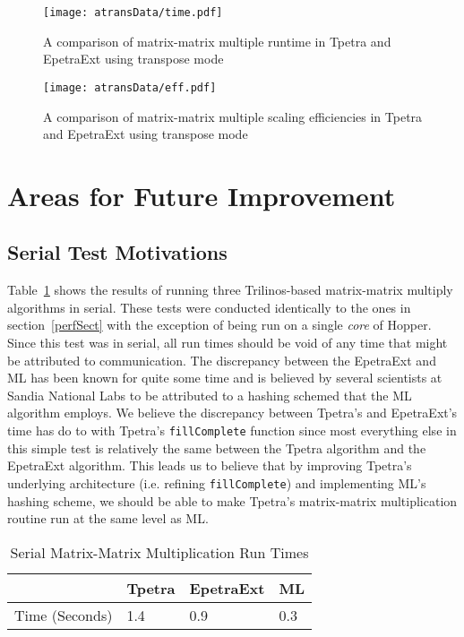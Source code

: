 \documentclass[pdf,12pt]{SANDreport}
\begin{document}
\begin{figure}
\centering
\texttt{[image: atransData/time.pdf]}
\caption[Transpose Time Comparison]{A comparison of matrix-matrix multiple runtime in Tpetra and EpetraExt using transpose mode}
\label{transtime}
\end{figure}

\begin{figure}
\centering
\texttt{[image: atransData/eff.pdf]}
\caption[Transpose Efficiency Comparison]{A comparison of matrix-matrix multiple scaling efficiencies in Tpetra and EpetraExt using transpose mode}
\label{transeff}
\end{figure}

\section{Areas for Future Improvement}

\subsection{Serial Test Motivations}
Table~\ref{serialTable} shows the results of running three Trilinos-based matrix-matrix multiply algorithms in 
serial. These tests were conducted identically to the ones in section~\ref{perfSect} with the exception of being run on a 
single \emph{core} of Hopper. Since this test was in serial, all run times should be void of any time that might be 
attributed to communication. The discrepancy between the EpetraExt and ML has been known for quite some time and 
is believed by several scientists at Sandia National Labs to be attributed to a hashing schemed that the ML algorithm 
employs. We believe the discrepancy between Tpetra's and EpetraExt's time has do to with Tpetra's 
\verb!fillComplete! function since most everything else in this simple test 
is relatively the same between the Tpetra algorithm and the EpetraExt algorithm. This leads us to believe that
by improving Tpetra's underlying architecture (i.e. refining \verb!fillComplete!) and implementing ML's hashing
scheme, we should be able to make Tpetra's matrix-matrix multiplication routine run at the same level as ML.

\begin{table}
\centering
\begin{tabular}{ | l | l | l | l | }
\hline
 & Tpetra & EpetraExt & ML \\ \hline
Time (Seconds) & 1.4 & 0.9 & 0.3 \\ \hline
\end{tabular}
\caption{Serial Matrix-Matrix Multiplication Run Times}
\label{serialTable}
\end{table}
\end{document}
